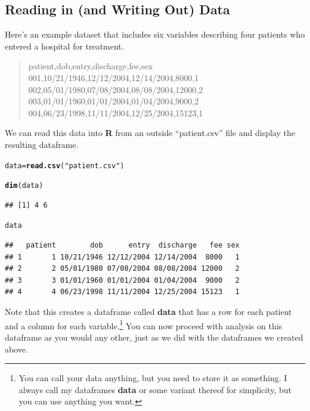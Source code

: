 \documentclass[12pt]{article}\usepackage[]{graphicx}\usepackage[]{color}
\makeatletter
\newcommand{\hlstr}[1]{\textcolor[rgb]{0.192,0.494,0.8}{#1}}%
\newcommand{\hlstd}[1]{\textcolor[rgb]{0.345,0.345,0.345}{#1}}%
\newcommand{\hlkwb}[1]{\textcolor[rgb]{0.69,0.353,0.396}{#1}}%
\newcommand{\hlkwd}[1]{\textcolor[rgb]{0.737,0.353,0.396}{\textbf{#1}}}%
\newenvironment{kframe}{%
 \def\at@end@of@kframe{}%
 \ifinner\ifhmode%
  \def\at@end@of@kframe{\end{minipage}}%
  \begin{minipage}{\columnwidth}%
 \fi\fi%
 \def\FrameCommand##1{\hskip\@totalleftmargin \hskip-\fboxsep
 \colorbox{shadecolor}{##1}\hskip-\fboxsep
     \hskip-\linewidth \hskip-\@totalleftmargin \hskip\columnwidth}%
 \MakeFramed {\advance\hsize-\width
   \@totalleftmargin\z@ \linewidth\hsize
   \@setminipage}}%
 {\par\unskip\endMakeFramed%
 \at@end@of@kframe}
\newenvironment{knitrout}{}{} %
\makeatother
\begin{document}
\subsection{Reading in (and Writing Out) Data}
Here's an example dataset that includes six variables describing four patients who entered a hospital for treatment.
\begin{quote}
patient,dob,entry,discharge,fee,sex\\
001,10/21/1946,12/12/2004,12/14/2004,8000,1\\
002,05/01/1980,07/08/2004,08/08/2004,12000,2\\
003,01/01/1960,01/01/2004,01/04/2004,9000,2\\
004,06/23/1998,11/11/2004,12/25/2004,15123,1\\
\end{quote}
We can read this data into \textbf{R} from an outside ``patient.csv'' file and display the resulting dataframe.
\begin{knitrout}
\color{fgcolor}\begin{kframe}
\begin{alltt}
\hlstd{data} \hlkwb{=} \hlkwd{read.csv}\hlstd{(}\hlstr{"patient.csv"}\hlstd{)}
\end{alltt}


{\ttfamily\noindent\color{warningcolor}{\#\# Warning: incomplete final line found by readTableHeader on 'patient.csv'}}\begin{alltt}
\hlkwd{dim}\hlstd{(data)}
\end{alltt}
\begin{verbatim}
## [1] 4 6
\end{verbatim}
\begin{alltt}
\hlstd{data}
\end{alltt}
\begin{verbatim}
##   patient        dob      entry  discharge   fee sex
## 1       1 10/21/1946 12/12/2004 12/14/2004  8000   1
## 2       2 05/01/1980 07/08/2004 08/08/2004 12000   2
## 3       3 01/01/1960 01/01/2004 01/04/2004  9000   2
## 4       4 06/23/1998 11/11/2004 12/25/2004 15123   1
\end{verbatim}
\end{kframe}
\end{knitrout}

Note that this creates a dataframe called \textbf{data} that has a row for each patient and a column for each variable.\footnote{You can call your data anything, but you need to store it as something. I always call my dataframes \textbf{data} or some variant thereof for simplicity, but you can use anything you want.} You can now proceed with analysis on this dataframe as you would any other, just as we did with the dataframes we created above.
\end{document}
